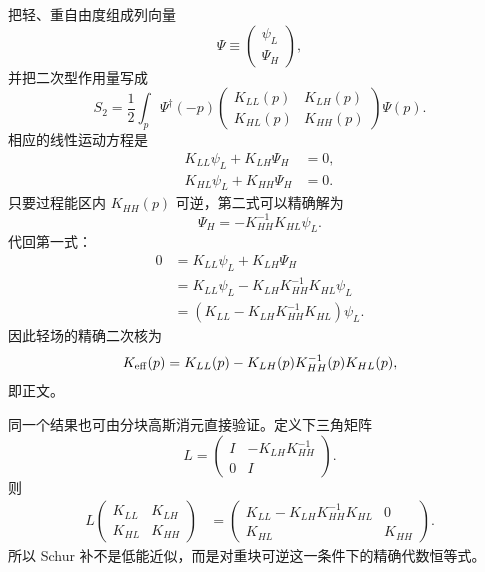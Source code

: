 \begin{derivation}
把轻、重自由度组成列向量
\begin{equation*}
 \Psi\equiv
 \begin{pmatrix}
  \psi_L\\ \Psi_H
 \end{pmatrix},
\end{equation*}
并把二次型作用量写成
\begin{equation*}
 S_2
 =\frac12\int_p
 \Psi^\dagger(-p)
 \begin{pmatrix}
 K_{LL}(p)&K_{LH}(p)\\
 K_{HL}(p)&K_{HH}(p)
 \end{pmatrix}
 \Psi(p).
\end{equation*}
相应的线性运动方程是
\begin{align*}
 K_{LL}\psi_L+K_{LH}\Psi_H&=0,\\
 K_{HL}\psi_L+K_{HH}\Psi_H&=0.
\end{align*}
只要过程能区内 $K_{HH}(p)$ 可逆，第二式可以精确解为
\begin{equation*}
 \Psi_H=-K_{HH}^{-1}K_{HL}\psi_L.
\end{equation*}
代回第一式：
\begin{align*}
 0
 &=K_{LL}\psi_L+K_{LH}\Psi_H\\
 &=K_{LL}\psi_L
 -K_{LH}K_{HH}^{-1}K_{HL}\psi_L\\
 &=\left(K_{LL}-K_{LH}K_{HH}^{-1}K_{HL}\right)\psi_L.
\end{align*}
因此轻场的精确二次核为
\begin{equation*}
 K_{\rm eff}(p)
 =K_{LL}(p)-K_{LH}(p)K_{HH}^{-1}(p)K_{HL}(p),
\end{equation*}
即正文。

同一个结果也可由分块高斯消元直接验证。定义下三角矩阵
\begin{equation*}
 L=
 \begin{pmatrix}
 I&-K_{LH}K_{HH}^{-1}\\
 0&I
 \end{pmatrix}.
\end{equation*}
则
\begin{align*}
 L
 \begin{pmatrix}
 K_{LL}&K_{LH}\\
 K_{HL}&K_{HH}
 \end{pmatrix}
 &=
 \begin{pmatrix}
 K_{LL}-K_{LH}K_{HH}^{-1}K_{HL}&0\\
 K_{HL}&K_{HH}
 \end{pmatrix}.
\end{align*}
所以 Schur 补不是低能近似，而是对重块可逆这一条件下的精确代数恒等式。


\end{derivation}
